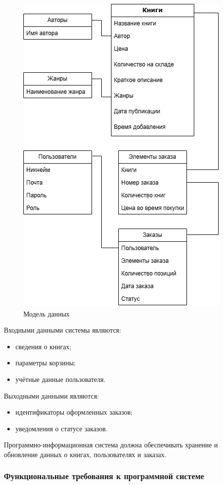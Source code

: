 \begin{figure}[H]
	\centering
	\includegraphics[width=0.7\linewidth]{"images/Модель_данных"}
	\caption{Модель данных}
	\label{fig:--}
\end{figure}

Входными данными системы являются:
\begin{itemize}
	\item сведения о книгах;
	\item параметры корзины;
	\item учётные данные пользователя.
\end{itemize}

Выходными данными являются:
\begin{itemize}
	\item идентификаторы оформленных заказов;
	\item уведомления о статусе заказов.
\end{itemize}



Программно-информационная система должна обеспечивать хранение и обновление данных о книгах, пользователях и заказах.

\subsubsection{Функциональные требования к программной системе}

